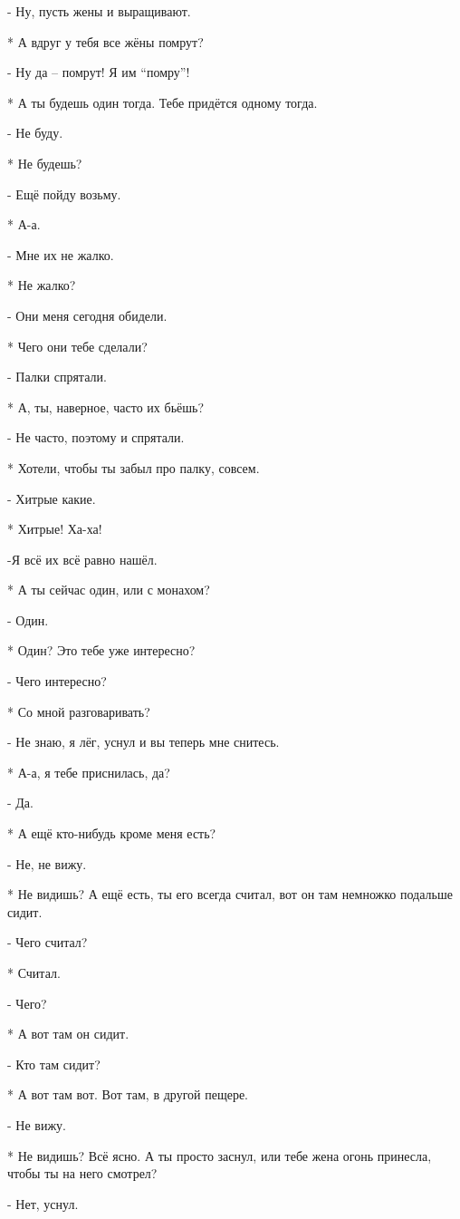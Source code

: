 - Ну, пусть жены и выращивают.

* А вдруг у тебя все жёны помрут?

- Ну да – помрут! Я им “помру”!

* А ты будешь один тогда. Тебе придётся одному тогда.

- Не буду. 

* Не будешь?

-  Ещё пойду возьму.

* А-а.

- Мне их не жалко.

* Не жалко?

- Они меня сегодня обидели.

* Чего они тебе сделали?

- Палки спрятали.

* А, ты, наверное, часто их бьёшь?

- Не часто, поэтому и спрятали.

* Хотели, чтобы ты забыл про палку, совсем.

- Хитрые какие.

* Хитрые! Ха-ха!

-Я всё их всё равно нашёл.

* А ты сейчас один, или с монахом?

- Один.

* Один? Это тебе уже интересно?

- Чего интересно?

* Со мной разговаривать?

- Не знаю, я лёг, уснул и вы теперь мне снитесь.

* А-а, я тебе приснилась, да?

- Да.

* А ещё кто-нибудь кроме меня есть?

- Не, не вижу.

* Не видишь? А ещё есть, ты его всегда считал, вот он там немножко подальше сидит.

- Чего считал?

* Считал.

- Чего?

* А вот там он сидит.

- Кто там сидит?

* А вот там вот. Вот там, в другой пещере.

- Не вижу.

* Не видишь? Всё ясно. А ты просто заснул, или тебе жена огонь принесла, чтобы ты на него смотрел?

- Нет, уснул.

